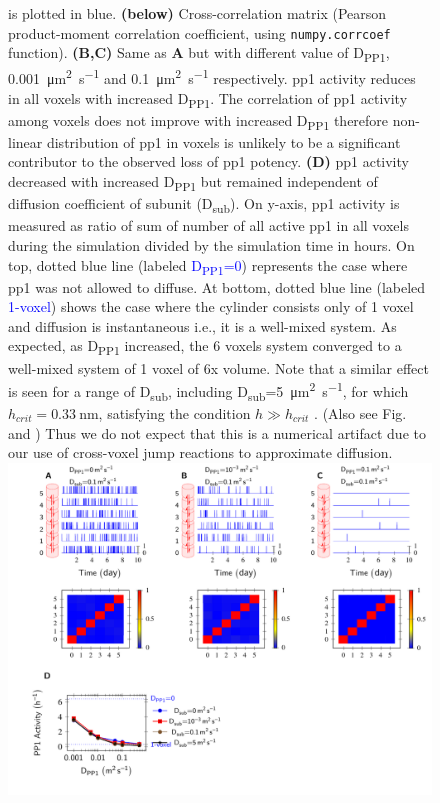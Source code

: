 \documentclass[9pt,lineno,doublespacing]{elife}
\newcommand\SUB[2]{#1\textsubscript{#2}}
\begin{document}
\begin{figure}
{        is plotted in blue. \textbf{(below)} Cross-correlation matrix (Pearson
        product-moment correlation coefficient, using \texttt{numpy.corrcoef}
        function). \textbf{(B,C)} Same as \textbf{A} but with different value of
        \SUB{D}{PP1}, \SI{0.001}{\micro\meter\squared\per\second} and
        \SI{0.1}{\micro\meter\squared\per\second} respectively. \gls{pp1} activity
        reduces in all voxels with increased \SUB{D}{PP1}. The correlation of
        \gls{pp1} activity among voxels does not improve with increased
        \SUB{D}{PP1} therefore non-linear distribution of \gls{pp1} in voxels is
        unlikely to be a significant contributor to the observed loss of \gls{pp1}
        potency. \textbf{(D)} \gls{pp1} activity decreased
        with increased \SUB{D}{PP1} but remained independent of diffusion
        coefficient of subunit (\SUB{D}{sub}). On y-axis, \gls{pp1} activity is measured as ratio
        of sum of number of all active \gls{pp1} in all voxels during the
        simulation divided by the simulation time in hours. On top, dotted blue
        line (labeled \textcolor{blue}{\SUB{D}{PP1}=0}) represents the case where
        \gls{pp1} was not allowed to diffuse. At bottom, dotted blue line
        (labeled \textcolor{blue}{1-voxel}) shows the case where the cylinder
        consists only of 1 voxel and diffusion is instantaneous i.e., it is a
        well-mixed system. As expected, as \SUB{D}{PP1} increased, the 6 voxels system converged to a
        well-mixed system of 1 voxel of 6x volume.
        Note that a similar effect is seen for a range of \SUB{D}{sub},
        including \SUB{D}{sub}=\SI{5}{\micro\meter\squared\per\second}, for
        which $h_{crit}=\SI{0.33}{\nano\meter}$, satisfying the condition \(h\gg h_{crit}\)
        \citep{isaacson_reaction-diffusion_2009}\citep{erban_stochastic_2009}.
        (Also see Fig.  and )
        Thus we do not expect that this is a numerical artifact due to our use
        of cross-voxel jump reactions to approximate diffusion. 
}{\includegraphics[width=\linewidth]{./PaperFigures/suppl/figure_pp1_profile.pdf}}

\end{figure}
\end{document}
